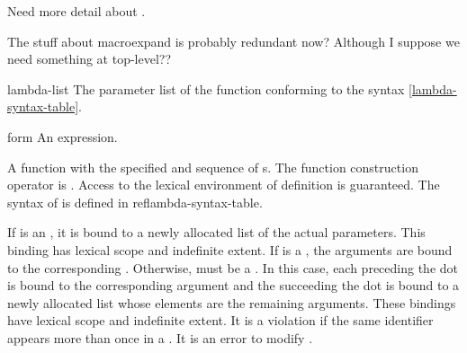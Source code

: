 \label{function}
%
\begin{optPrivate}
    Need more detail about .

    The stuff about macroexpand is probably redundant now?  Although I
    suppose we need something at top-level??
\end{optPrivate}
%
\begin{optDefinition}
%
%
\Syntax
\label{lambda-syntax-table}
%
%
\begin{arguments}
    \item[lambda-list] The parameter list of the function conforming to the
    syntax \ref{lambda-syntax-table}.
    \item[form] An expression.
\end{arguments}
%
\result%
A function with the specified  and sequence of s.
%
\remarks%
The function construction operator is .  Access to the lexical
environment of definition is guaranteed.  The syntax of  is
defined in ref{lambda-syntax-table}.

If  is an , it is bound to a newly
allocated list of the actual parameters.  This binding  has lexical scope and indefinite
extent.  If  is a , the arguments are
bound to the corresponding .  Otherwise, 
must be a .  In this case, each  preceding
the dot is bound to the corresponding argument and the 
succeeding the dot is bound to a newly allocated list whose elements are the
remaining arguments.  These bindings have lexical scope and indefinite extent.
It is a violation if the same identifier appears more than once in a
.  It is an error to modify .


\end{optDefinition}
